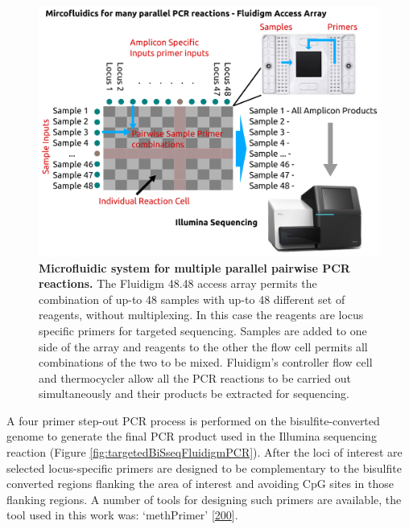 \documentclass[
]{book}
\begin{document}
\begin{figure}

{\centering \includegraphics[width=0.6\linewidth]{figs/targeted_BiSseq_fluidigm_generic} 

}

\caption{\textbf{Microfluidic system for multiple parallel pairwise PCR reactions.}
The Fluidigm 48.48 access array permits the combination of up-to 48 samples with up-to 48 different set of reagents, without multiplexing. In this case the reagents are locus specific primers for targeted sequencing. Samples are added to one side of the array and reagents to the other the flow cell permits all combinations of the two to be mixed. Fluidigm's controller flow cell and thermocycler allow all the PCR reactions to be carried out simultaneously and their products be extracted for sequencing.}\label{fig:targetedBiSseqFluidigmGeneric}
\end{figure}




A four primer step-out PCR process is performed on the bisulfite-converted genome to generate the final PCR product used in the Illumina sequencing reaction (Figure \ref{fig:targetedBiSseqFluidigmPCR}).
After the loci of interest are selected locus-specific primers are designed to be complementary to the bisulfite converted regions flanking the area of interest and avoiding CpG sites in those flanking regions.
A number of tools for designing such primers are available, the tool used in this work was: `methPrimer' {[}\protect\hyperlink{ref-Li2002}{200}{]}.
\end{document}
